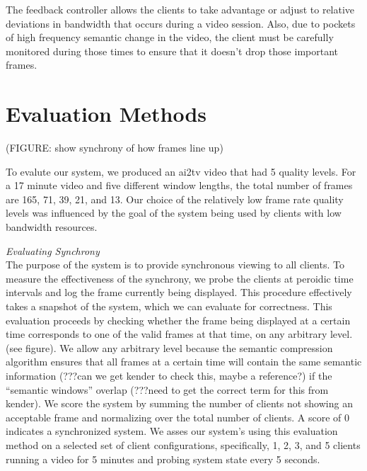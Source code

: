 \documentclass{sig-alternate}
\begin{document}
The feedback controller allows the clients to take advantage or adjust
to relative deviations in bandwidth that occurs during a video
session.  Also, due to pockets of high frequency semantic change in
the video, the client must be carefully monitored during those times
to ensure that it doesn't drop those important frames.

\section{Evaluation Methods} \label{eval}

(FIGURE: show synchrony of how frames line up)

To evalute our system, we produced an ai2tv video that had 5 quality
levels.  For a 17 minute video and five different window lengths, the
total number of frames are 165, 71, 39, 21, and 13.  Our choice of the
relatively low frame rate quality levels was influenced by the goal of
the system being used by clients with low bandwidth resources.
 

\textit{Evaluating Synchrony} \\ The purpose of the system is to
provide synchronous viewing to all clients.  To measure the
effectiveness of the synchrony, we probe the clients at peroidic time
intervals and log the frame currently being displayed.  This procedure
effectively takes a snapshot of the system, which we can evaluate for
correctness.  This evaluation proceeds by checking whether the frame
being displayed at a certain time corresponds to one of the valid
frames at that time, on any arbitrary level.  (see figure).  We allow
any arbitrary level because the semantic compression algorithm ensures
that all frames at a certain time will contain the same semantic
information (???can we get kender to check this, maybe a reference?)
if the ``semantic windows'' overlap (???need to get the correct term
for this from kender).  We score the system by summing the number of
clients not showing an acceptable frame and normalizing over the total
number of clients.  A score of 0 indicates a synchronized system.  We
asses our system's using this evaluation method on a selected set of
client configurations, specifically, 1, 2, 3, and 5 clients running a
video for 5 minutes and probing system state every 5 seconds.
\end{document}
